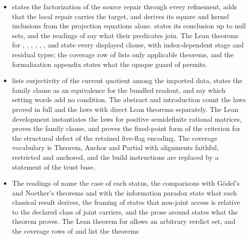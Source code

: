 \begin{itemize}
  ,  and  state these forms, with an arbitrary
  status type for ; the coverage row of  lists first the
  theorems that take the paper's hypotheses. The formalization appendix
  states that the trust-base axiom can refute its guard, the answer to the
  anchor-row objection says what each anchor row adds, and the catalog
  application of  states which of its clauses are met.
\item {} states the factorization of the source repair through
  every refinement,  adds that the local repair carries the
  target, and  derives its square and kernel inclusions from
  the projection equations alone.  states its conclusion up to
  null sets, and the readings of  say what their
  predicates join. The Lean theorems for , , ,
  , , ,  and  state every
  displayed clause,  with index-dependent stage and residual
  types; the coverage row of  lists only applicable theorems, and
  the formalization appendix states what the opaque guard of 
  permits.
\item {} lists surjectivity of the current quotient among the
  imported data,  states the family clause as an equivalence
  for the bundled readout, and  say which setting words
  add no condition. The abstract and introduction count the laws proved in
  full and the laws with direct Lean theorems separately. The Lean
  development instantiates the  laws for positive semidefinite
  rational matrices, proves the  family clause, and proves the
  fixed-point form of the  criterion for the structural defect of
  the retained five-flag encoding. The coverage vocabulary is Theorem, Anchor and Partial
  with alignments faithful, restricted and anchored, and the build
  instructions are replaced by a statement of the trust base.
\item The readings of  name the case of each
  status, the comparisons with G\"odel's and Noether's theorems and with the
  information paradox state what each classical result derives, the framing
  of  states that non-joint access is relative to the declared
  class of joint carriers, and the prose around  states what the
  theorem proves. The Lean theorem for  allows an arbitrary verdict
  set, and the coverage rows of  and  list the theorems

\end{itemize}
